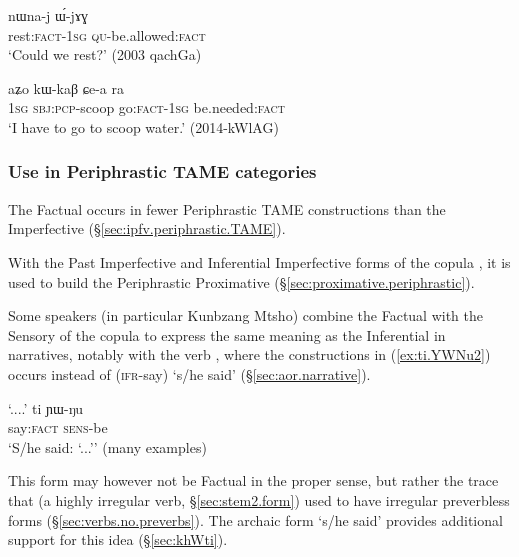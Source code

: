 \begin{exe}
\ex \label{ex:nWnaj.WjAG}
\gll nɯna-j ɯ́-jɤɣ \\
rest:\textsc{fact}-\textsc{1sg} \textsc{qu}-be.allowed:\textsc{fact} \\
\glt `Could we rest?' (2003 qachGa)
\end{exe}

\begin{exe}
\ex \label{ex:Cea.ra}
\gll aʑo kɯ-kaβ ɕe-a ra \\
\textsc{1sg} \textsc{sbj}:\textsc{pcp}-scoop go:\textsc{fact}-\textsc{1sg} be.needed:\textsc{fact} \\
\glt `I have to go to scoop water.' (2014-kWlAG)
\end{exe} 

\subsubsection{Use in Periphrastic TAME categories} \label{sec:fact.periphrastic}
The Factual occurs in fewer Periphrastic TAME constructions than the Imperfective (§\ref{sec:ipfv.periphrastic.TAME}).

With the Past Imperfective  and Inferential Imperfective  forms of the copula , it is used to build the Periphrastic Proximative (§\ref{sec:proximative.periphrastic}).

Some speakers (in particular Kunbzang Mtsho) combine the Factual with the Sensory  of the copula to express the same meaning as the Inferential in narratives, notably with the verb , where the constructions in (\ref{ex:ti.YWNu2}) occurs instead of  (\textsc{ifr}-say) `s/he said' (§\ref{sec:aor.narrative}).

\begin{exe}
\ex \label{ex:ti.YWNu2}
\gll `....' ti ɲɯ-ŋu \\
{ } say:\textsc{fact} \textsc{sens}-be \\
\glt `S/he said: `...'' (many examples)
\end{exe}

This form may however not be Factual in the proper sense, but rather the trace that  (a highly irregular verb, §\ref{sec:stem2.form}) used to have irregular preverbless forms (§\ref{sec:verbs.no.preverbs}). The archaic form  `s/he said' provides additional support for this idea (§\ref{sec:khWti}).


